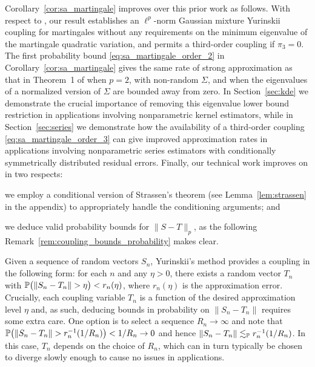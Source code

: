 Corollary~\ref{cor:sa_martingale} improves over this prior work as follows.
With respect to \citet{li2020uniform}, our result establishes an $\ell^p$-norm
Gaussian mixture Yurinskii coupling for martingales without any requirements on
the minimum eigenvalue of the martingale quadratic variation, and permits a
third-order coupling if $\pi_3=0$. The first probability bound
\eqref{eq:sa_martingale_order_2} in Corollary~\ref{cor:sa_martingale} gives the
same rate of strong approximation as that in Theorem~1 of \citet{li2020uniform}
when $p=2$, with non-random $\Sigma$, and when the eigenvalues of a normalized
version of $\Sigma$ are bounded away from zero. In Section~\ref{sec:kde} we
demonstrate the crucial importance of removing this eigenvalue lower bound
restriction in applications involving nonparametric kernel estimators, while in
Section~\ref{sec:series} we demonstrate how the availability of a third-order
coupling \eqref{eq:sa_martingale_order_3} can give improved approximation rates
in applications involving nonparametric series estimators with conditionally
symmetrically distributed residual errors. Finally, our technical work improves
on \citet{li2020uniform} in two respects:
%
\begin{inlineroman}
\item
  we employ a conditional version
  of Strassen's theorem (see Lemma~\ref{lem:strassen} in the appendix)
  to appropriately handle the conditioning arguments; and
\item
  we deduce valid
  probability bounds for $\|S-T\|_p$, as the following
  Remark~\ref{rem:coupling_bounds_probability} makes clear.
\end{inlineroman}

\begin{remark}
  \label{rem:coupling_bounds_probability}
  Given a sequence of random vectors $S_n$, Yurinskii's method provides a
  coupling in the following form: for each $n$ and any $\eta > 0$, there exists
  a random vector $T_n$ with $\P\big(\|S_n - T_n\| > \eta\big) < r_n(\eta)$,
  where $r_n(\eta)$ is the approximation error. Crucially, each coupling
  variable $T_n$ is a function of the desired approximation level $\eta$ and,
  as such, deducing bounds in probability on $\|S_n - T_n\|$ requires some
  extra care. One option is to select a sequence $R_n \to \infty$ and note that
  $\P\big(\|S_n - T_n\| > r_n^{-1}(1 / R_n)\big) < 1 / R_n \to 0$ and hence
  $\|S_n - T_n\| \lesssim_\P r_n^{-1}(1 / R_n)$. In this case, $T_n$ depends on
  the choice of $R_n$, which can in turn typically be chosen to diverge slowly
  enough to cause no issues in applications.
\end{remark}


